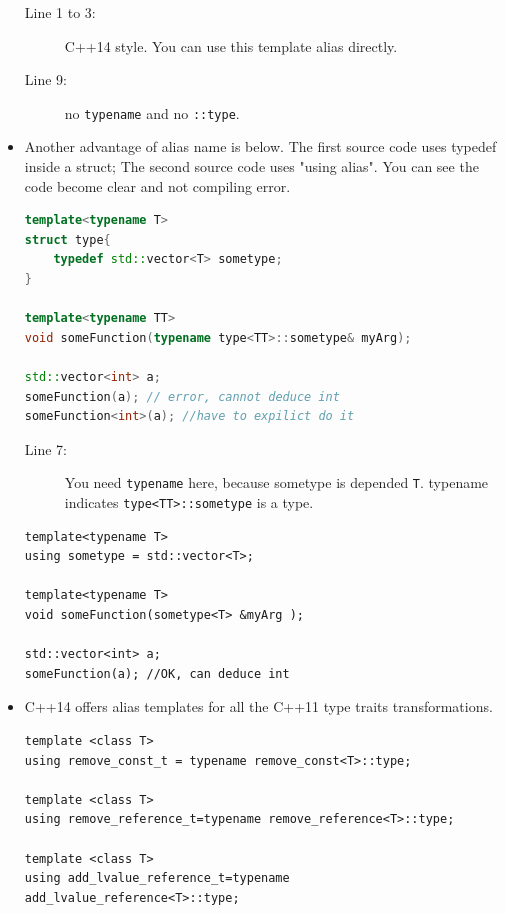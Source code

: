 \documentclass[a4paper,11pt,twoside]{book}
\begin{document}
\begin{itemize}
\begin{description}
	\item[Line 1 to 3:] C++14 style. You can use this template alias directly.
	\item[Line 9:] no \texttt{typename} and no \texttt{::type}.
\end{description}

\item Another advantage of alias name is below. The first source code uses typedef inside a struct; The second source code uses "using alias". You can see the code become clear and not compiling error.

\begin{lstlisting}[frame=single, language=c++]
template<typename T>
struct type{ 
	typedef std::vector<T> sometype; 
}

template<typename TT>
void someFunction(typename type<TT>::sometype& myArg);

std::vector<int> a;
someFunction(a); // error, cannot deduce int
someFunction<int>(a); //have to expilict do it 
\end{lstlisting}
\begin{description}
	\item[Line 7:] You need \texttt{typename} here, because sometype is depended \texttt{T}. \newline typename indicates \texttt{type<TT>::sometype} is a type.
\end{description}

\begin{lstlisting}[numbers=none]
template<typename T>
using sometype = std::vector<T>;

template<typename T>
void someFunction(sometype<T> &myArg );

std::vector<int> a;
someFunction(a); //OK, can deduce int
\end{lstlisting}


\item C++14 offers alias templates for all the C++11 type traits transformations.
\begin{lstlisting}[numbers=none]
template <class T>
using remove_const_t = typename remove_const<T>::type;

template <class T>
using remove_reference_t=typename remove_reference<T>::type;

template <class T>
using add_lvalue_reference_t=typename add_lvalue_reference<T>::type;
\end{lstlisting}

\end{itemize}
\end{document}
